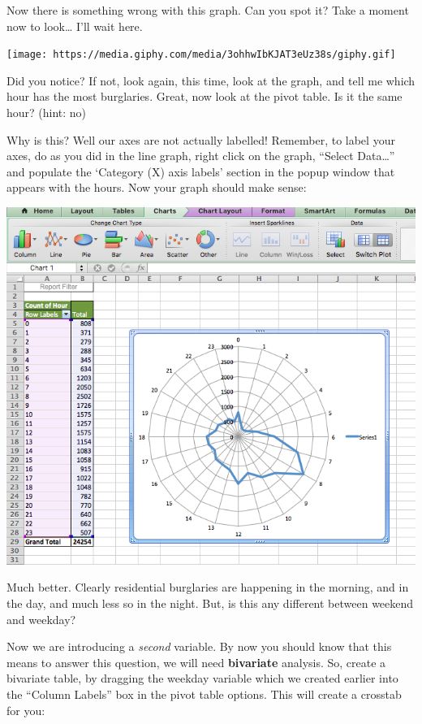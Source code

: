 \documentclass[]{book}
\theoremstyle{definition}
\theoremstyle{definition}
\theoremstyle{definition}
\theoremstyle{remark}
\begin{document}
Now there is something wrong with this graph. Can you spot it? Take a
moment now to look\ldots{} I'll wait here.

\texttt{[image: https://media.giphy.com/media/3ohhwIbKJAT3eUz38s/giphy.gif]}

Did you notice? If not, look again, this time, look at the graph, and
tell me which hour has the most burglaries. Great, now look at the pivot
table. Is it the same hour? (hint: no)

Why is this? Well our axes are not actually labelled! Remember, to label
your axes, do as you did in the line graph, right click on the graph,
``Select Data\ldots{}'' and populate the `Category (X) axis labels'
section in the popup window that appears with the hours. Now your graph
should make sense:

\includegraphics{imgs/correct_hr_1.png}

Much better. Clearly residential burglaries are happening in the
morning, and in the day, and much less so in the night. But, is this any
different between weekend and weekday?

Now we are introducing a \emph{second} variable. By now you should know
that this means to answer this question, we will need \textbf{bivariate}
analysis. So, create a bivariate table, by dragging the weekday variable
which we created earlier into the ``Column Labels'' box in the pivot
table options. This will create a crosstab for you:
\end{document}
